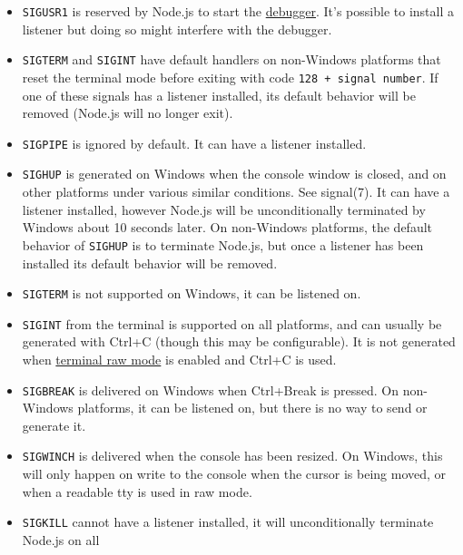 \begin{itemize}
\tightlist
\item
  \texttt{\textquotesingle{}SIGUSR1\textquotesingle{}} is reserved by
  Node.js to start the \href{debugger.md}{debugger}. It's possible to
  install a listener but doing so might interfere with the debugger.
\item
  \texttt{\textquotesingle{}SIGTERM\textquotesingle{}} and
  \texttt{\textquotesingle{}SIGINT\textquotesingle{}} have default
  handlers on non-Windows platforms that reset the terminal mode before
  exiting with code \texttt{128\ +\ signal\ number}. If one of these
  signals has a listener installed, its default behavior will be removed
  (Node.js will no longer exit).
\item
  \texttt{\textquotesingle{}SIGPIPE\textquotesingle{}} is ignored by
  default. It can have a listener installed.
\item
  \texttt{\textquotesingle{}SIGHUP\textquotesingle{}} is generated on
  Windows when the console window is closed, and on other platforms
  under various similar conditions. See signal(7). It can have a
  listener installed, however Node.js will be unconditionally terminated
  by Windows about 10 seconds later. On non-Windows platforms, the
  default behavior of \texttt{SIGHUP} is to terminate Node.js, but once
  a listener has been installed its default behavior will be removed.
\item
  \texttt{\textquotesingle{}SIGTERM\textquotesingle{}} is not supported
  on Windows, it can be listened on.
\item
  \texttt{\textquotesingle{}SIGINT\textquotesingle{}} from the terminal
  is supported on all platforms, and can usually be generated with
  Ctrl+C (though this may be configurable). It is not generated when
  \href{tty.md\#readstreamsetrawmodemode}{terminal raw mode} is enabled
  and Ctrl+C is used.
\item
  \texttt{\textquotesingle{}SIGBREAK\textquotesingle{}} is delivered on
  Windows when Ctrl+Break is pressed. On non-Windows platforms, it can
  be listened on, but there is no way to send or generate it.
\item
  \texttt{\textquotesingle{}SIGWINCH\textquotesingle{}} is delivered
  when the console has been resized. On Windows, this will only happen
  on write to the console when the cursor is being moved, or when a
  readable tty is used in raw mode.
\item
  \texttt{\textquotesingle{}SIGKILL\textquotesingle{}} cannot have a
  listener installed, it will unconditionally terminate Node.js on all

\end{itemize}
